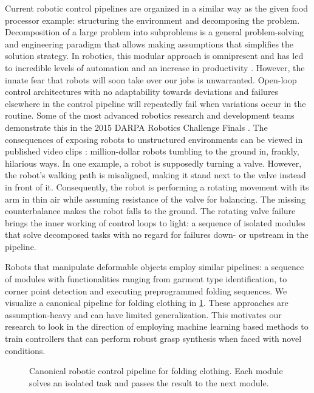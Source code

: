 \documentclass[\home/main.tex]{subfiles}
\begin{document}
Current robotic control pipelines are organized in a similar way as the given food processor example: structuring the environment and decomposing the problem. Decomposition of a large problem into subproblems is a general problem-solving and engineering paradigm that allows making assumptions that simplifies the solution strategy. In robotics, this modular approach is omnipresent and has led to incredible levels of automation and an increase in productivity \autocite{Graetz2018}. However, the innate fear that robots will soon take over our jobs \autocite{cave2019hopes} is unwarranted.
Open-loop control architectures with no adaptability towards deviations and failures elsewhere in the control pipeline will repeatedly fail when variations occur in the routine. Some of the most advanced robotics research and development teams demonstrate this in the 2015 DARPA Robotics Challenge Finals \autocite{DARPA2015}. The consequences of exposing robots to unstructured environments can be viewed in published video clips \autocite{darpaVideos}: million-dollar robots tumbling to the ground in, frankly, hilarious ways. In one example, a robot is supposedly turning a valve. However, the robot's walking path is misaligned, making it stand next to the valve instead in front of it. Consequently, the robot is performing a rotating movement with its arm in thin air while assuming resistance of the valve for balancing. The missing counterbalance makes the robot falls to the ground. The rotating valve failure brings the inner working of control loops to light: a sequence of isolated modules that solve decomposed tasks with no regard for failures down- or upstream in the pipeline.

Robots that manipulate deformable objects employ similar pipelines: a sequence of modules with functionalities ranging from garment type identification, to corner point detection and executing preprogrammed folding sequences. We visualize a canonical pipeline for folding clothing in \cref{fig:intro_canonical_control_pipeline}. These approaches are assumption-heavy and can have limited generalization. This motivates our research to look in the direction of employing machine learning based methods to train controllers that can perform robust grasp synthesis when faced with novel conditions.

\begin{figure}
    \centering
    
    \caption{Canonical robotic control pipeline for folding clothing. Each module solves an isolated task and passes the result to the next module.}
    \label{fig:intro_canonical_control_pipeline}
\end{figure}
\end{document}
